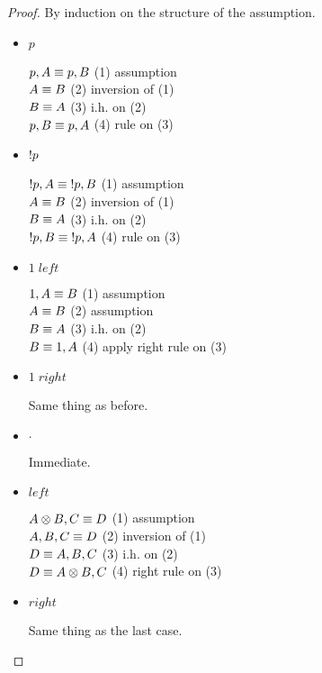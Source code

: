 \begin{proof}
   By induction on the structure of the assumption.
   
   \begin{itemize}
      \item $p$
      
      $p, A \equiv p, B$ \hfill (1) assumption \\
      $A \equiv B$ \hfill (2) inversion of (1) \\
      $B \equiv A$ \hfill (3) i.h. on (2) \\
      $p, B \equiv p, A$ \hfill (4) rule on (3) \\
      
      \item ${!} p$
      
      ${!} p, A \equiv {!} p, B$ \hfill (1) assumption \\
      $A \equiv B$ \hfill (2) inversion of (1) \\
      $B \equiv A$ \hfill (3) i.h. on (2) \\
      ${!} p, B \equiv {!} p, A$ \hfill (4) rule on (3) \\
      
      \item $1 \; left$
      
      $1, A \equiv B$ \hfill (1) assumption \\
      $A \equiv B$ \hfill (2) assumption \\
      $B \equiv A$ \hfill (3) i.h. on (2) \\
      $B \equiv 1, A$ \hfill (4) apply right rule on (3) \\
      
      \item $1 \; right$
      
      Same thing as before.
      
      \item $\cdot$

      Immediate.

      \item $left$

      $A \otimes B, C \equiv D$ \hfill (1) assumption \\
      $A, B, C \equiv D$ \hfill (2) inversion of (1) \\
      $D \equiv A, B, C$ \hfill (3) i.h. on (2) \\
      $D \equiv A \otimes B, C$ \hfill (4) right rule on (3) \\

      \item $right$

      Same thing as the last case.
   \end{itemize}
\end{proof}

